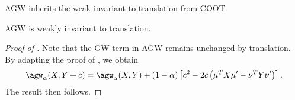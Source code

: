 AGW inherits the weak invariant to translation from COOT.
\begin{proposition}
\label{prop:invariant}
AGW is weakly invariant to translation.
\end{proposition}
\begin{proof}[Proof of ]
Note that the GW term in AGW remains unchanged by translation.
By adapting the proof of , we obtain
\begin{align}
    \agw_{\alpha}(X, Y + c) = \agw_{\alpha}(X, Y) + (1 - \alpha) \left[ c^2
    - 2 c \left( \mu^T X \mu' - \nu^T Y \nu' \right) \right].
\end{align}
The result then follows.
\end{proof}